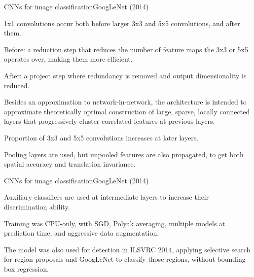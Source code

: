 \documentclass[aspectratio=169]{beamer}
\begin{document}
\begin{frame}{CNNs for image classification}{GoogLeNet (2014)}

  1x1 convolutions occur both \alert{before} larger 3x3 and 5x5
  convolutions, and \alert{after} them.

  \medskip

  Before: a \alert{reduction} step that reduces the number of
  feature maps the 3x3 or 5x5 operates over, making them more
  efficient.

  \medskip
	
  After: a \alert{project} step where redundancy is removed
  and output dimensionality is reduced.

  \medskip

  Besides an approximation to network-in-network, the architecture
  is intended to approximate theoretically optimal construction of
  \alert{large, sparse, locally connected layers} that progressively
  cluster correlated features at previous layers.

  \medskip

  Proportion of 3x3 and 5x5 convolutions increases at later layers.

  \medskip

  Pooling layers are used, but unpooled features are also propagated,
  to get both spatial accuracy and translation invariance.

\end{frame}


\begin{frame}{CNNs for image classification}{GoogLeNet (2014)}

  Auxiliary classifiers are used at intermediate layers to increase
  their discrimination ability.

  \medskip

  Training was CPU-only, with SGD, Polyak averaging, multiple models
  at prediction time, and aggressive data augmentation.

  \medskip

  The model was also used for detection in ILSVRC 2014, applying selective
  search for region proposals and GoogLeNet to classify
  those regions, without bounding box regression.

\end{frame}
\end{document}
